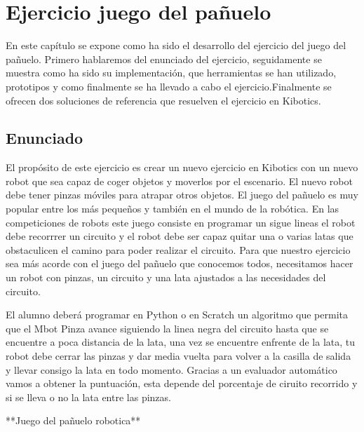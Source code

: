 \chapter{Ejercicio juego del pañuelo}\label{pañuelo}
En este capítulo se expone como ha sido el desarrollo del ejercicio del juego del pañuelo. Primero hablaremos del enunciado del ejercicio, seguidamente se muestra como ha sido su implementación, que herramientas se han utilizado, prototipos y como finalmente se ha llevado a cabo el ejercicio.Finalmente se ofrecen dos soluciones de referencia que resuelven el ejercicio en Kibotics.
\section{Enunciado}
El propósito de este ejercicio es crear un nuevo ejercicio en Kibotics con un nuevo robot que sea capaz de coger objetos y moverlos por el escenario. El nuevo robot debe tener pinzas móviles para atrapar otros objetos. El juego del pañuelo es muy popular entre los más pequeños y también en el mundo de la robótica. En las competiciones de robots este juego consiste en programar un sigue lineas el robot debe recorrrer un circuito y el robot debe ser capaz quitar una o varias latas que obstaculicen el camino para poder realizar el circuito. Para que nuestro ejercicio sea más acorde con el juego del pañuelo que conocemos todos, necesitamos hacer un robot con pinzas, un circuito y una lata ajustados a las necesidades del circuito.

El alumno deberá programar en Python o en Scratch un algoritmo que permita que el Mbot Pinza avance siguiendo la linea negra del circuito hasta que se encuentre a poca distancia de la lata, una vez se encuentre enfrente de la lata, tu robot debe cerrar las pinzas y dar media vuelta para volver a la casilla de salida y  llevar consigo la lata en todo momento. Gracias a un evaluador automático vamos a obtener la puntuación, esta depende del porcentaje de ciruito recorrido y si se lleva o no la lata entre las pinzas.


**Juego del pañuelo robotica**

